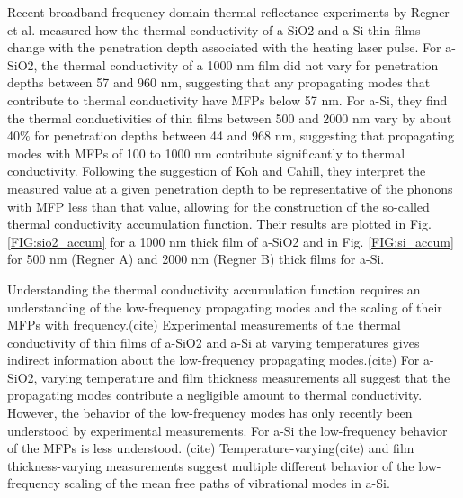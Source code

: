 \documentclass[aps,prb,onecolumn,preprint,superscriptaddress,footinbib,amsmath,amssymb,floatfix]{revtex4}
\begin{document}
Recent broadband frequency domain thermal-reflectance experiments 
by Regner et al. measured how the thermal conductivity of a-SiO2 and 
a-Si thin films change with the penetration depth associated with the 
heating laser pulse.\cite{regner_broadband_2013} 
For a-SiO2, the thermal conductivity of a 1000 nm 
film did not vary for penetration depths between 57 and 960 nm, 
suggesting that any propagating modes that contribute to thermal 
conductivity have MFPs below 57 nm. For a-Si, they find the 
thermal conductivities of thin films between 500 and 2000 nm 
vary by about 
40$\%$ for penetration depths between 44 and 968 nm, suggesting 
that propagating modes with MFPs of 100 to 1000 nm contribute 
significantly to thermal conductivity.\cite{regner_broadband_2013}  
Following the suggestion of Koh and Cahill, they interpret the 
measured value at a given penetration depth to be representative 
of the phonons with MFP less than that value, allowing for the 
construction of the so-called thermal conductivity accumulation 
function. Their results are plotted in Fig. \ref{FIG:sio2_accum} 
for a 1000 nm thick film of a-SiO2 
and in Fig. \ref{FIG:si_accum} for 500 nm (Regner A) and 
2000 nm (Regner B) thick films for a-Si.\cite{regner_broadband_2013} 

Understanding the thermal conductivity accumulation function 
requires an understanding of the low-frequency propagating 
modes and the scaling of their MFPs with 
frequency.(cite) 
Experimental measurements of the thermal conductivity of
thin films of a-SiO2 and a-Si at varying temperatures 
gives indirect information about the low-frequency propagating 
modes.(cite) For a-SiO2, 
varying temperature 
and film thickness
\cite{lee_heat_1997,yamane_measurement_2002} 
measurements all suggest that the propagating modes 
contribute a negligible amount to thermal conductivity. 
However, the behavior of the low-frequency modes 
has only recently been understood by experimental 
measurements.
\cite{masciovecchio_evidence_2006,baldi_thermal_2008,
baldi_sound_2010,baldi_elastic_2011,baldi_emergence_2013} 
For a-Si the low-frequency behavior of the MFPs is less understood.
(cite) 
Temperature-varying(cite) and film thickness-varying measurements
\cite{pompe_thermal_1988,cahill_thermal_1989,hasselman_thermal_1989,
kuo_thermal_1992,feldman_thermal_1993,cahill_thermal_1994,
wada_thermal_1996,feldman_numerical_1999,
moon_thermal_2002,zink_thermal_2006,zink_excess_2006,liu_high_2009,
yang_anomalously_2010}
suggest multiple different behavior of the low-frequency 
scaling of the mean free paths of vibrational modes in a-Si. 
\end{document}
